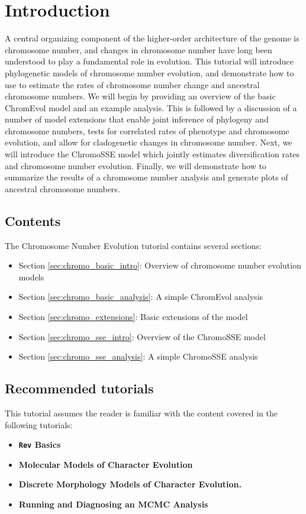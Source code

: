 \section*{Introduction}

A central organizing component of the higher-order architecture of the
genome is chromosome number, and changes in chromosome number have long
been understood to play a fundamental role in evolution.
This tutorial will introduce phylogenetic models of chromosome number evolution,
and demonstrate how to use \RevBayes 
to estimate the rates of chromosome number change and ancestral chromosome numbers.
We will begin by providing an overview of the basic ChromEvol model and 
an example \RevBayes analysis. 
This is followed by a discussion of a number of model extensions 
that enable joint inference of phylogeny
and chromosome numbers, tests for correlated rates of phenotype and chromosome evolution,
and allow for cladogenetic changes in chromosome number.
Next, we will introduce the ChromoSSE model which jointly
estimates diversification rates and chromosome number evolution.
Finally, we will demonstrate how to summarize the results of a \RevBayes
chromosome number analysis and generate plots of ancestral chromosome numbers.

\subsection*{Contents}

The Chromosome Number Evolution tutorial contains several sections:

\begin{itemize}
\item Section \ref{sec:chromo_basic_intro}: Overview of chromosome number evolution models
\item Section \ref{sec:chromo_basic_analysis}: A simple ChromEvol analysis
\item Section \ref{sec:chromo_extensions}: Basic extensions of the model
\item Section \ref{sec:chromo_sse_intro}: Overview of the ChromoSSE model
\item Section \ref{sec:chromo_sse_analysis}: A simple ChromoSSE analysis
\end{itemize}

\subsection*{Recommended tutorials}

This tutorial assumes the reader is familiar with the content covered in the following \RevBayes tutorials:

\begin{itemize}
\item {\bf {\tt \large Rev} Basics}
\item {\bf Molecular Models of Character Evolution}
\item {\bf Discrete Morphology Models of Character Evolution.}
\item {\bf Running and Diagnosing an MCMC Analysis}
\end{itemize}

\newpage
